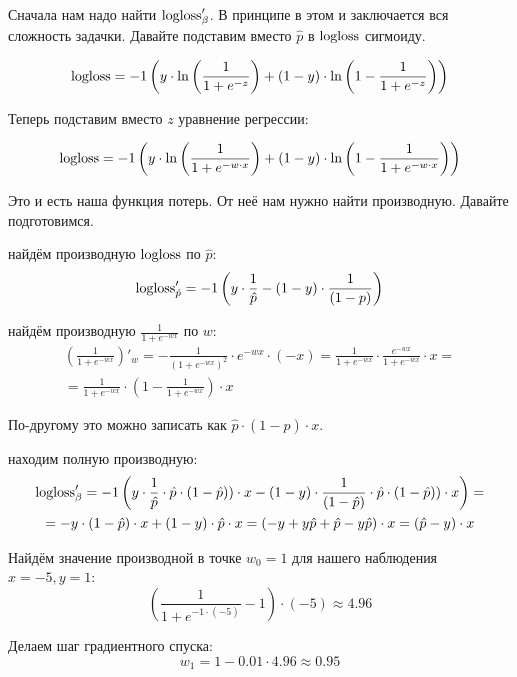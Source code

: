 \begin{sol}
Сначала нам надо найти $\operatorname{logloss}'_{\beta}$. В принципе в этом и заключается вся сложность задачки. Давайте подставим вместо $\hat p $ в $\operatorname{logloss}$ сигмоиду. 

$$
\operatorname{logloss} = -1 \left (y \cdot \ln \left( \frac{1}{1 + e^{-z}} \right)  + (1 - y) \cdot \ln \left ( 1 - \frac{1}{1 + e^{-z}} \right ) \right)
$$
	
Теперь подставим вместо $z$ уравнение регрессии:
	

$$
\operatorname{logloss} = -1 \left (y \cdot \ln \left( \frac{1}{1 + e^{-w \cdot x}} \right)  + (1 - y) \cdot \ln \left ( 1 - \frac{1}{1 + e^{- w \cdot x}} \right ) \right)
$$

Это и есть наша функция потерь.  От неё нам нужно найти производную. Давайте подготовимся. 

 найдём производную $\operatorname{logloss}$ по $\hat p$: 
$$
\operatorname{logloss}'_{\hat p} = -1 \left(y \cdot \frac{1}{\hat p} - (1 - y) \cdot \frac{1}{(1 - p)} \right)
$$

 найдём производную $\frac{1}{1 + e^{-w x}} $ по $w$: 
\begin{multline*}
\left(  \frac{1}{1 + e^{-w x}}   \right)'_{w}  = - \frac{1}{(1 + e^{-w x})^2} \cdot e^{-w x} \cdot (-x) =\frac{1}{1 + e^{-w x}}  \cdot \frac{e^{-w x}}{1 + e^{-w x}} \cdot x  = \\ = \frac{1}{1 + e^{-w x}}  \cdot  \left(1 - \frac{1}{1 + e^{-w x}}  \right) \cdot x
\end{multline*}

По-другому это можно записать как $\hat p \cdot (1 - \hat p) \cdot x$.  

 находим полную производную:
\begin{multline*}
\operatorname{logloss}'_{\beta} = -1 \left(y \cdot \frac{1}{\hat p}  \cdot  \hat p \cdot  \left(1 - \hat p)  \right) \cdot x  - (1 - y) \cdot \frac{1}{(1 - \hat p)} \cdot  \hat p \cdot  \left(1 - \hat p)  \right) \cdot x \right) = \\ =  -y \cdot \left( 1 - \hat p \right) \cdot x + (1 - y) \cdot  \hat p  \cdot x =  (-y + y \hat p  + \hat p - y \hat p ) \cdot x = (\hat p - y) \cdot x
\end{multline*}
	
Найдём значение производной в точке $w_0 = 1$ для нашего наблюдения $x = -5, y=1$: 
$$
\left(\frac{1}{1 + e^{-1 \cdot (-5)}}  - 1 \right) \cdot (-5)  \approx  4.96
$$

Делаем шаг градиентного спуска: 
$$
w_1 = 1 - 0.01 \cdot 4.96 \approx 0.95
$$	
\end{sol} 

